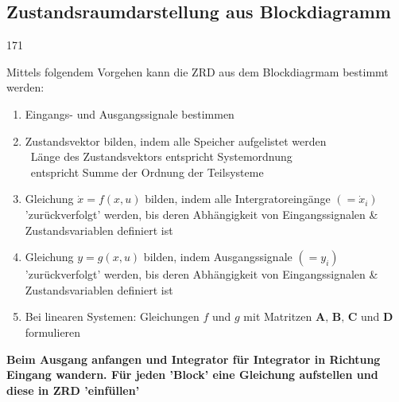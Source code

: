 \subsection{Zustandsraumdarstellung aus Blockdiagramm}{171}
\label{Zustandsraumdarstellung aus Blockdiagramm}

Mittels folgendem Vorgehen kann die ZRD aus dem Blockdiagrmam bestimmt werden:

\smallskip
\begin{enumerate}
    \item Eingangs- und Ausgangssignale bestimmen
    \item Zustandsvektor bilden, indem alle Speicher aufgelistet werden \\
        \textrightarrow\ Länge des Zustandsvektors entspricht Systemordnung \\
        \textrightarrow\ entspricht Summe der Ordnung der Teilsysteme
    \item Gleichung $\dot{x} = f(x, u)$ bilden, indem alle Intergratoreingänge $(=\dot{x}_i)$ 'zurückverfolgt' werden,
        bis deren Abhängigkeit von Eingangssignalen \& Zustandsvariablen definiert ist
    \item Gleichung $y = g(x, u)$ bilden, indem Ausgangssignale $(=y_i)$ 'zurückverfolgt' werden, bis deren Abhängigkeit von 
        Eingangssignalen \& Zustandsvariablen definiert ist
    \item Bei linearen Systemen: Gleichungen $f$ und $g$ mit Matritzen $\bm{A}, \, \bm{B}, \, \bm{C}$ und $\bm{D}$ formulieren
\end{enumerate}

\vspace{-0.1cm}

\textbf{Beim Ausgang anfangen und Integrator für Integrator in Richtung Eingang wandern. 
Für jeden 'Block' eine Gleichung aufstellen und diese in ZRD 'einfüllen'}



